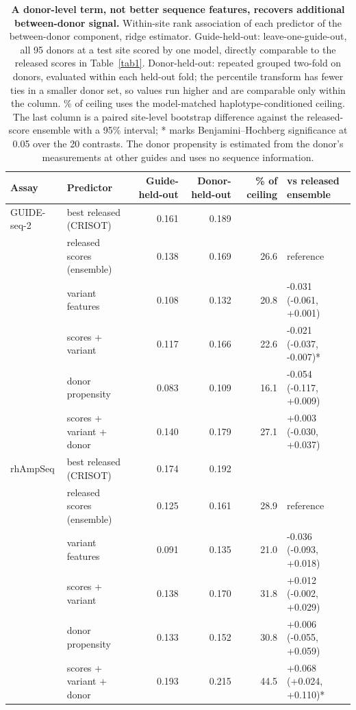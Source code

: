 \begin{table}[htbp]
\centering
\caption{\textbf{A donor-level term, not better sequence features, recovers additional between-donor signal.} Within-site rank association of each predictor of the between-donor component, ridge estimator. Guide-held-out: leave-one-guide-out, all 95 donors at a test site scored by one model, directly comparable to the released scores in Table~\ref{tab1}. Donor-held-out: repeated grouped two-fold on donors, evaluated within each held-out fold; the percentile transform has fewer ties in a smaller donor set, so values run higher and are comparable only within the column. \% of ceiling uses the model-matched haplotype-conditioned ceiling. The last column is a paired site-level bootstrap difference against the released-score ensemble with a 95\% interval; * marks Benjamini--Hochberg significance at 0.05 over the 20 contrasts. The donor propensity is estimated from the donor's measurements at other guides and uses no sequence information.}\label{tab3}
\footnotesize
\setlength{\tabcolsep}{5pt}
\begin{tabular}{@{}llrrrl@{}}
\toprule
Assay & Predictor & Guide-held-out & Donor-held-out & \% of ceiling & vs released ensemble \\
\midrule
GUIDE-seq-2 & best released (CRISOT) & 0.161 & 0.189 &  &  \\
\midrule
 & released scores (ensemble) & 0.138 & 0.169 & 26.6 & reference \\
 & variant features & 0.108 & 0.132 & 20.8 & -0.031 (-0.061, +0.001) \\
 & scores + variant & 0.117 & 0.166 & 22.6 & -0.021 (-0.037, -0.007)* \\
 & donor propensity & 0.083 & 0.109 & 16.1 & -0.054 (-0.117, +0.009) \\
 & scores + variant + donor & 0.140 & 0.179 & 27.1 & +0.003 (-0.030, +0.037) \\
\midrule
rhAmpSeq & best released (CRISOT) & 0.174 & 0.192 &  &  \\
\midrule
 & released scores (ensemble) & 0.125 & 0.161 & 28.9 & reference \\
 & variant features & 0.091 & 0.135 & 21.0 & -0.036 (-0.093, +0.018) \\
 & scores + variant & 0.138 & 0.170 & 31.8 & +0.012 (-0.002, +0.029) \\
 & donor propensity & 0.133 & 0.152 & 30.8 & +0.006 (-0.055, +0.059) \\
 & scores + variant + donor & 0.193 & 0.215 & 44.5 & +0.068 (+0.024, +0.110)* \\
\bottomrule
\end{tabular}
\end{table}
